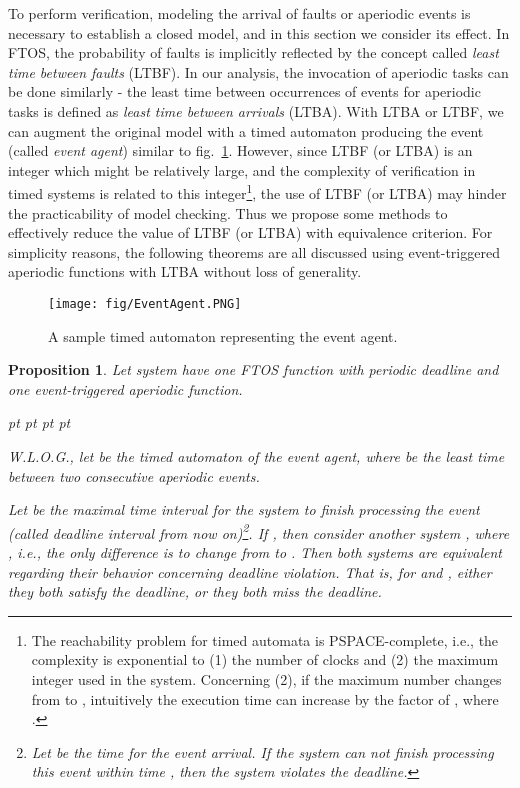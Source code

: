 \documentclass[10pt, a4paper, onecolumn, conference, compsocconf]{IEEEtran}
\newenvironment{list1}{\begin{list}{}
{\topsep 0 pt \parsep 0 pt \partopsep 0 pt \itemsep 0
pt}}{\end{list}}
\newtheorem{prop}{Proposition}
\begin{document}
To perform verification, modeling the arrival of faults or aperiodic events is necessary to establish a closed model, and in this section we consider its effect.
In FTOS, the probability of faults is implicitly reflected by the concept called \emph{least time between faults} (LTBF). In our analysis, the invocation of aperiodic tasks can be done similarly - the least time between occurrences
of events for aperiodic tasks is defined as \emph{least time between arrivals} (LTBA). With LTBA or LTBF,
we can augment the original model with a timed automaton producing the event (called \emph{event agent}) similar to fig.~\ref{fig:TA.event.agent}.
However, since LTBF (or LTBA) is an integer which might be relatively large, and the complexity of verification in timed systems is related to this
integer\footnote{The reachability problem for timed automata is PSPACE-complete, i.e., the complexity is exponential to (1) the number of clocks and (2) the
maximum integer used in the system. Concerning (2), if the maximum number changes from  to , intuitively the execution time can increase by the factor of , where .},
the use of LTBF (or LTBA) may hinder the practicability of model checking.
Thus we propose some methods to effectively reduce the value of LTBF (or LTBA) with equivalence criterion.
For simplicity reasons, the following theorems are all discussed using event-triggered aperiodic functions with LTBA without loss of generality.

\begin{figure}
 \centering
 \texttt{[image: fig/EventAgent.PNG]}
 \caption{A sample timed automaton representing the event agent.}
 \label{fig:TA.event.agent}
\end{figure}

\begin{prop}\label{simple}
Let system  have one FTOS function with periodic deadline  and one event-triggered aperiodic function. \begin{list1}
\item W.L.O.G., let  be the timed automaton of the event agent,
where  be the least time between two consecutive aperiodic events.
\end{list1}
Let  be the maximal time interval for the system to finish processing the event (called deadline interval from now on)\footnote{Let  be the time for the event arrival. If the system can not finish processing this event within time , then the system violates the deadline.}. If , then consider another system , where , i.e., the
only difference is to change  from  to . Then both systems are equivalent regarding their behavior concerning deadline violation.
That is, for  and , either they both satisfy the deadline, or they both miss the deadline.
\end{prop}
\end{document}

